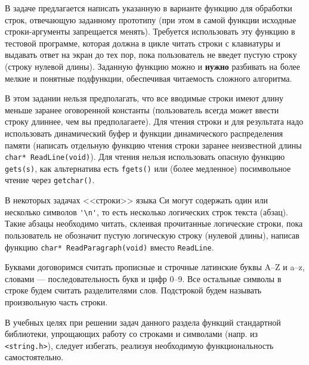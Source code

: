 
В задаче предлагается написать указанную в варианте функцию для обработки строк,
отвечающую заданному прототипу (при этом в самой функции исходные строки-аргументы
запрещается менять). Требуется использовать эту функцию в тестовой программе,
которая должна в цикле читать строки с клавиатуры и выдавать ответ на экран до
тех пор, пока пользователь не введет пустую строку (строку нулевой длины). 
Заданную функцию можно и \textbf{нужно} разбивать на более мелкие и понятные
подфункции, обеспечивая читаемость сложного алгоритма.

В этом задании нельзя предполагать, что все вводимые строки имеют длину меньше
заранее оговоренной константы (пользователь всегда может ввести строку длиннее,
чем вы предполагаете). Для чтения строки и для результата надо использовать
динамический буфер и функции динамического распределения памяти (написать отдельную
функцию чтения строки заранее неизвестной длины \texttt{char* ReadLine(void)}).
Для чтения нельзя использовать опасную функцию \texttt{gets(s)},
как альтернатива есть \texttt{fgets()} или (более медленное) посимвольное чтение
через \texttt{getchar()}.

В некоторых задачах <<строки>> языка Си
могут содержать один или несколько символов \verb|'\n'|, то есть несколько
логических строк текста (абзац). Такие абзацы необходимо читать, склеивая
прочитанные логические строки, пока пользователь не обозначит пустую логическую
строку (нулевой длины), написав функцию \texttt{char* ReadParagraph(void)}
вместо \texttt{ReadLine}.

Буквами договоримся считать прописные и строчные латинские буквы 
A--Z и a--z, словами --- последовательность букв и цифр 0--9. Все остальные
символы в строке будем считать разделителями слов. Подстрокой будем называть
произвольную часть строки.

В учебных целях при решении задач данного раздела функций стандартной
библиотеки, упрощающих работу со строками и символами (напр. из 
\texttt{<string.h>}), следует избегать, реализуя необходимую
функциональность самостоятельно.

